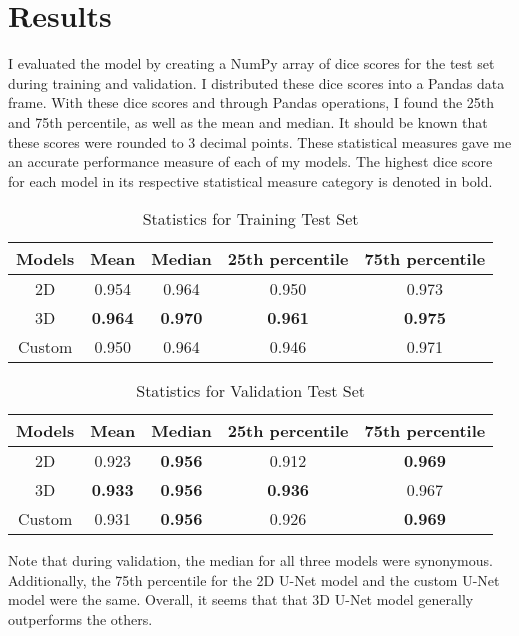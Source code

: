 \documentclass [12pt, letterpaper] {article}
\begin{document}
\section{Results}
I evaluated the model by creating a NumPy array of dice scores for the test set during training and validation. I distributed these dice scores into a Pandas data frame. With these dice scores and through Pandas operations, I found the 25th and 75th percentile, as well as the mean and median. It should be known that these scores were rounded to 3 decimal points. These statistical measures gave me an accurate performance measure of each of my models. The highest dice score for each model in its respective statistical measure category is denoted in bold. 
\begin{table}[h!]
\centering

\begin{tabular}{||c c c c c ||} 
 \hline
 Models & Mean & Median & 25th percentile & 75th percentile \\ [0.5ex] 
 \hline
 2D & 0.954 & 0.964 & 0.950 & 0.973 \\ 
 3D & \textbf{0.964} & \textbf{0.970} & \textbf{0.961} & \textbf{0.975}\\
 Custom & 0.950 & 0.964 & 0.946 & 0.971\\

 \hline
\end{tabular}

\caption{Statistics for Training Test Set}
\label{table:data}
\end{table}

\begin{table}[h!]
\centering

\begin{tabular}{||c c c c c ||} 
 \hline
 Models & Mean & Median & 25th percentile & 75th percentile \\ [0.5ex] 
 \hline
 2D  & 0.923 & \textbf{0.956} & 0.912 & \textbf{0.969}\\ 
 3D  & \textbf{0.933} & \textbf{0.956} & \textbf{0.936} &0.967 \\
 Custom & 0.931 & \textbf{0.956} &  0.926 & \textbf{0.969}\\

 \hline
\end{tabular}

\caption{Statistics for Validation Test Set}
\label{table:data}
\end{table}

Note that during validation, the median for all three models were synonymous. Additionally, the 75th percentile for the 2D U-Net model and the custom U-Net model were the same. Overall, it seems that that 3D U-Net model generally outperforms the others. 
\end{document}
